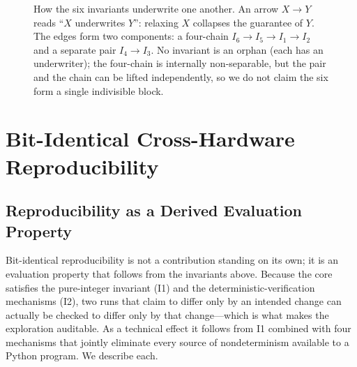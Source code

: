 \documentclass[11pt,a4paper]{article}
\begin{document}
\begin{figure}[t]
\centering
{}
\caption{How the six invariants underwrite one another. An arrow
$X \to Y$ reads ``$X$ underwrites $Y$'': relaxing $X$ collapses the
guarantee of $Y$. The edges form two components: a four-chain
$I_6 \to I_5 \to I_1 \to I_2$ and a separate pair $I_4 \to I_3$. No
invariant is an orphan (each has an underwriter); the four-chain is
internally non-separable, but the pair and the chain can be lifted
independently, so we do not claim the six form a single indivisible
block.}
\label{fig:invariants}
\end{figure}

\section{Bit-Identical Cross-Hardware Reproducibility}
\label{sec:bitidentical}

\subsection{Reproducibility as a Derived Evaluation Property}
Bit-identical reproducibility is not a contribution standing on its own;
it is an evaluation property that follows from the invariants above.
Because the core satisfies the pure-integer invariant (I1) and the
deterministic-verification mechanisms (I2), two runs that claim to differ
only by an intended change can actually be checked to differ only by that
change---which is what makes the exploration auditable. As a technical
effect it follows from I1 combined with four mechanisms that jointly
eliminate every source of nondeterminism available to a Python program.
We describe each.
\end{document}
